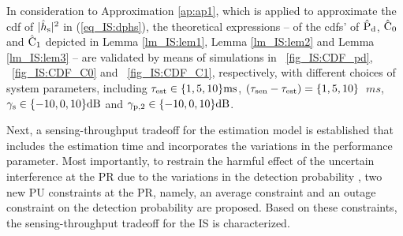 In consideration to Approximation \ref{ap:ap1}, which is applied to approximate the cdf of $|\hat{h}_{\text{s}}|^2$ in (\ref{eq_IS:dphs}), the theoretical expressions -- of the cdfs' of $\hat{\text{P}}_{\text{d}}$, $\hat{\text{C}}_{\text{0}}$ and $\hat{\text{C}}_{\text{1}}$ depicted in Lemma \ref{lm_IS:lem1}, Lemma \ref{lm_IS:lem2} and Lemma \ref{lm_IS:lem3} -- are validated by means of simulations in \figurename~\ref{fig_IS:CDF_pd}, \figurename~\ref{fig_IS:CDF_C0} and \figurename~\ref{fig_IS:CDF_C1}, respectively, with different choices of system parameters, including $\tau_{\text{est}} \in \{1,5,10\} \SI{}{ms}$, $(\tau_{\text{sen}} - \tau_{\text{est}}) = \{1,5,10\}$ $\SI{}{ms}$, ${\gamma}_{\text{s}} \in \{-10, 0, 10\} \SI{}{dB}$ and  ${\gamma}_{\text{p,2}} \in \{-10, 0, 10\} \SI{}{dB}$. 

Next, a sensing-throughput tradeoff for the estimation model is established that includes the estimation time and incorporates the variations in the performance parameter. Most importantly, to restrain the harmful effect of the uncertain interference at the PR due to the variations in the detection probability%
, two new PU constraints at the PR, namely, an average constraint and an outage constraint on the detection probability are proposed. Based on these constraints, the sensing-throughput tradeoff for the IS is characterized. 


